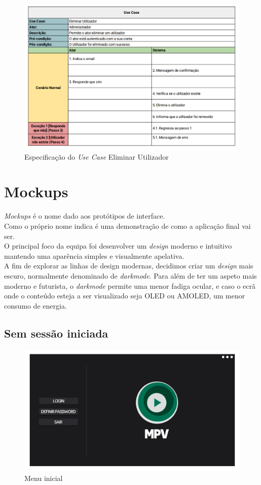 \documentclass[a4paper]{report}
\begin{document}
\begin{figure}[H]
	\centering 
    \includegraphics[width=\textwidth]{images/Remover_Conta.png}  
    \caption{Especificação do \emph{Use Case} Eliminar Utilizador}
\end{figure}

\chapter{Mockups}

\textit{Mockups} é o nome dado aos protótipos de interface.\\
Como o próprio nome indica é uma demonstração de como a aplicação final vai
ser.\\
O principal foco da equipa foi desenvolver um \textit{design} moderno e
intuitivo mantendo uma aparência simples e visualmente apelativa.\\
A fim de explorar as linhas de design modernas, decidimos criar um
\textit{design} mais escuro, normalmente denominado de \textit{darkmode}. Para
além de ter um aspeto mais moderno e futurista, o \textit{darkmode} permite uma
menor fadiga ocular, e caso o ecrã onde o conteúdo esteja a ser visualizado seja
OLED ou AMOLED, um menor consumo de energia.

\section{Sem sessão iniciada}

\begin{figure}[H]
	\centering 
    \includegraphics[width=\textwidth]{images/Inicio_Menu.png}  
    \caption{Menu inicial}
\end{figure}
\end{document}
